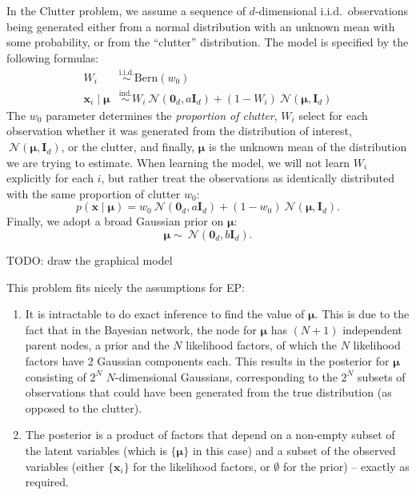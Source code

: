 \documentclass[11pt]{article}
\newcommand{\term}[1]{\textit{#1}}
\newcommand{\vek}[1]{\ensuremath{\mathbf{#1}}}
\newcommand{\bern}{\ensuremath{\text{Bern}}}
\newcommand{\norm}{\ensuremath{\:\mathcal{N}}}
\newcommand{\unity}{\ensuremath{\mathbf{I}}}
\newcommand{\iid}{\ensuremath{\stackrel{\text{i.i.d.}}{\sim}}}
\newcommand{\ind}{\ensuremath{\stackrel{\text{ind.}}{\sim}}}
\begin{document}
In the Clutter problem, we assume a sequence of $d$-dimensional i.i.d.\ 
observations being generated either from a normal distribution with an 
unknown mean with some probability, or from the ``clutter'' 
distribution. The model is specified by the following formulas:
\begin{align}
	W_i &\iid \bern(w_0) \\
	\vek{x}_i\mid\boldsymbol{\mu} &\ind W_i \norm(\vek{0}_d, a\unity_{d}) + (1 - W_i) \norm(\boldsymbol{\mu}, 
\unity_{d})
\end{align}
The $w_0$ parameter determines the \term{proportion of clutter}, $W_i$ 
select for each observation whether it was generated from the 
distribution of interest, $\norm(\boldsymbol{\mu}, \unity_{d})$, or the clutter, and 
finally, $\boldsymbol{\mu}$ is the unknown mean of the distribution we are trying to 
estimate. When learning the model, we will not learn $W_i$ explicitly 
for each $i$, but rather treat the observations as identically 
distributed with the same proportion of clutter $w_0$:
\begin{equation}
	p(\vek{x} \mid \boldsymbol{\mu}) = w_0 \norm(\vek{0}_d, a \unity_d) + (1 - w_0)\norm(\boldsymbol{\mu}, 
	\unity_d).
	\label{eq:cl-posterior}
\end{equation}
Finally, we adopt a broad Gaussian prior on $\boldsymbol{\mu}$:
\begin{equation}
	\boldsymbol{\mu} \sim \norm(\vek{0}_d, b\unity_{d}).
\end{equation}

TODO: draw the graphical model

This problem fits nicely the assumptions for EP:
\begin{enumerate}
	\item It is intractable to do exact inference to find the value of $\boldsymbol{\mu}$.  
		This is due to the fact that in the Bayesian network, the node for 
		$\boldsymbol{\mu}$ has $(N + 1)$ independent parent nodes, a prior and the $N$ 
		likelihood factors, of which the $N$ likelihood factors have 2 Gaussian 
		components each. This results in the posterior for $\boldsymbol{\mu}$ consisting of 
		$2^N$ $N$-dimensional Gaussians, corresponding to the $2^N$ subsets of 
		observations that could have been generated from the true distribution 
		(as opposed to the clutter).

	\item The posterior is a product of factors that depend on a non-empty 
		subset of the latent variables (which is $\{\boldsymbol{\mu}\}$ in this case) and 
		a subset of the observed variables (either $\{\vek{x}_i\}$ for the likelihood 
		factors, or $\emptyset$ for the prior) -- exactly as required.
\end{enumerate}
\end{document}
